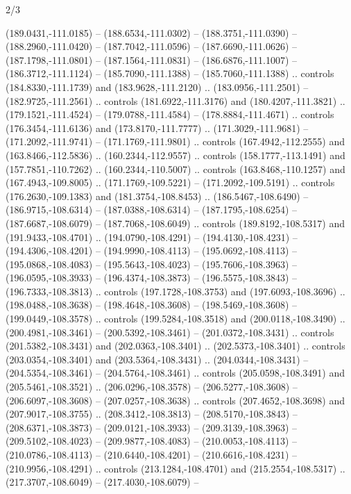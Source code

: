 \begin{flagdescription}{2/3}
\begin{scope}[xshift=0.3483\flagwidth*\stretchfactor]
\begin{scope}[scale=0.00336\flagwidth,xshift=-37mm,yshift=105.5mm]
\begin{scope}[y=0.80pt, x=0.80pt, yscale=-1, xscale=1, inner sep=0pt, outer sep=0pt]
\begin{scope}
\begin{scope}[draw=dark,miter limit=22.93]
\begin{scope}[fill=gold]
\begin{scope}[xscale=1.000,yscale=-1.000,line width=\lw]
  (189.0431,-111.0185) -- (188.6534,-111.0302) -- (188.3751,-111.0390) --
  (188.2960,-111.0420) -- (187.7042,-111.0596) -- (187.6690,-111.0626) --
  (187.1798,-111.0801) -- (187.1564,-111.0831) -- (186.6876,-111.1007) --
  (186.3712,-111.1124) -- (185.7090,-111.1388) -- (185.7060,-111.1388) ..
  controls (184.8330,-111.1739) and (183.9628,-111.2120) .. (183.0956,-111.2501)
  -- (182.9725,-111.2561) .. controls (181.6922,-111.3176) and
  (180.4207,-111.3821) .. (179.1521,-111.4524) -- (179.0788,-111.4584) --
  (178.8884,-111.4671) .. controls (176.3454,-111.6136) and (173.8170,-111.7777)
  .. (171.3029,-111.9681) -- (171.2092,-111.9741) -- (171.1769,-111.9801) ..
  controls (167.4942,-112.2555) and (163.8466,-112.5836) .. (160.2344,-112.9557)
  .. controls (158.1777,-113.1491) and (157.7851,-110.7262) ..
  (160.2344,-110.5007) .. controls (163.8468,-110.1257) and (167.4943,-109.8005)
  .. (171.1769,-109.5221) -- (171.2092,-109.5191) .. controls
  (176.2630,-109.1383) and (181.3754,-108.8453) .. (186.5467,-108.6490) --
  (186.9715,-108.6314) -- (187.0388,-108.6314) -- (187.1795,-108.6254) --
  (187.6687,-108.6079) -- (187.7068,-108.6049) .. controls (189.8192,-108.5317)
  and (191.9433,-108.4701) .. (194.0790,-108.4291) -- (194.4130,-108.4231) --
  (194.4306,-108.4201) -- (194.9990,-108.4113) -- (195.0692,-108.4113) --
  (195.0868,-108.4083) -- (195.5643,-108.4023) -- (195.7606,-108.3963) --
  (196.0595,-108.3933) -- (196.4374,-108.3873) -- (196.5575,-108.3843) --
  (196.7333,-108.3813) .. controls (197.1728,-108.3753) and (197.6093,-108.3696)
  .. (198.0488,-108.3638) -- (198.4648,-108.3608) -- (198.5469,-108.3608) --
  (199.0449,-108.3578) .. controls (199.5284,-108.3518) and (200.0118,-108.3490)
  .. (200.4981,-108.3461) -- (200.5392,-108.3461) -- (201.0372,-108.3431) ..
  controls (201.5382,-108.3431) and (202.0363,-108.3401) .. (202.5373,-108.3401)
  .. controls (203.0354,-108.3401) and (203.5364,-108.3431) ..
  (204.0344,-108.3431) -- (204.5354,-108.3461) -- (204.5764,-108.3461) ..
  controls (205.0598,-108.3491) and (205.5461,-108.3521) .. (206.0296,-108.3578)
  -- (206.5277,-108.3608) -- (206.6097,-108.3608) -- (207.0257,-108.3638) ..
  controls (207.4652,-108.3698) and (207.9017,-108.3755) .. (208.3412,-108.3813)
  -- (208.5170,-108.3843) -- (208.6371,-108.3873) -- (209.0121,-108.3933) --
  (209.3139,-108.3963) -- (209.5102,-108.4023) -- (209.9877,-108.4083) --
  (210.0053,-108.4113) -- (210.0786,-108.4113) -- (210.6440,-108.4201) --
  (210.6616,-108.4231) -- (210.9956,-108.4291) .. controls (213.1284,-108.4701)
  and (215.2554,-108.5317) .. (217.3707,-108.6049) -- (217.4030,-108.6079) --

\end{scope}
\end{scope}
\end{scope}
\end{scope}
\end{scope}
\end{scope}
\end{scope}
\end{flagdescription}
